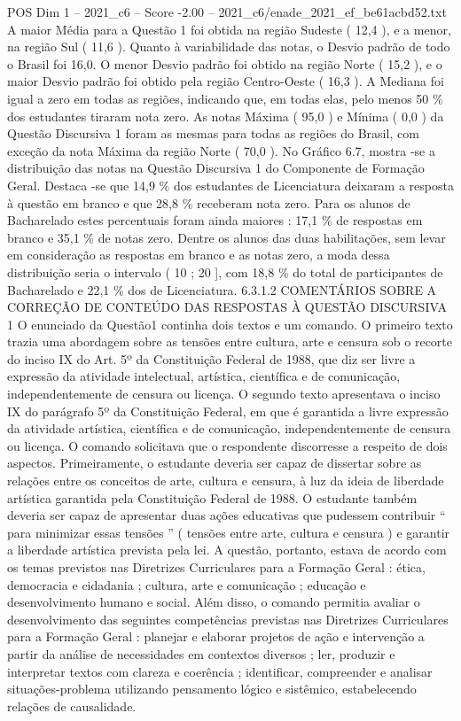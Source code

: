 \begin{textsample}{POS Dim 1 – 2021\_c6 – Score -2.00 – 2021\_c6/enade\_2021\_ef\_be61acbd52.txt}
A maior Média para a Questão 1 foi obtida na região Sudeste ( 12,4 ), e a menor, na região Sul ( 11,6 ).
Quanto à variabilidade das notas, o Desvio padrão de todo o Brasil foi 16,0.
O menor Desvio padrão foi obtido na região Norte ( 15,2 ), e o maior Desvio padrão foi obtido pela região Centro-Oeste ( 16,3 ).
A Mediana foi igual a zero em todas as regiões, indicando que, em todas elas, pelo menos 50 \% dos estudantes tiraram nota zero.
As notas Máxima ( 95,0 ) e Mínima ( 0,0 ) da Questão Discursiva 1 foram as mesmas para todas as regiões do Brasil, com exceção da nota Máxima da região Norte ( 70,0 ).
No Gráfico 6.7, mostra -se a distribuição das notas na Questão Discursiva 1 do Componente de Formação Geral.
Destaca -se que 14,9 \% dos estudantes de Licenciatura deixaram a resposta à questão em branco e que 28,8 \% receberam nota zero.
Para os alunos de Bacharelado estes percentuais foram ainda maiores : 17,1 \% de respostas em branco e 35,1 \% de notas zero.
Dentre os alunos das duas habilitações, sem levar em consideração as respostas em branco e as notas zero, a moda dessa distribuição seria o intervalo ( 10 ; 20 ], com 18,8 \% do total de participantes de Bacharelado e 22,1 \% dos de Licenciatura. 6.3.1.2 COMENTÁRIOS SOBRE A CORREÇÃO DE CONTEÚDO DAS RESPOSTAS À QUESTÃO DISCURSIVA 1 O enunciado da Questão1 continha dois textos e um comando.
O primeiro texto trazia uma abordagem sobre as tensões entre cultura, arte e censura sob o recorte do inciso IX do Art. 5º da Constituição Federal de 1988, que diz ser livre a expressão da atividade intelectual, artística, científica e de comunicação, independentemente de censura ou licença.
O segundo texto apresentava o inciso IX do parágrafo 5º da Constituição Federal, em que é garantida a livre expressão da atividade artística, científica e de comunicação, independentemente de censura ou licença.
O comando solicitava que o respondente discorresse a respeito de dois aspectos.
Primeiramente, o estudante deveria ser capaz de dissertar sobre as relações entre os conceitos de arte, cultura e censura, à luz da ideia de liberdade artística garantida pela Constituição Federal de 1988.
O estudante também deveria ser capaz de apresentar duas ações educativas que pudessem contribuir “ para minimizar essas tensões ” ( tensões entre arte, cultura e censura ) e garantir a liberdade artística prevista pela lei.
A questão, portanto, estava de acordo com os temas previstos nas Diretrizes Curriculares para a Formação Geral : ética, democracia e cidadania ; cultura, arte e comunicação ; educação e desenvolvimento humano e social.
Além disso, o comando permitia avaliar o desenvolvimento das seguintes competências previstas nas Diretrizes Curriculares para a Formação Geral : planejar e elaborar projetos de ação e intervenção a partir da análise de necessidades em contextos diversos ; ler, produzir e interpretar textos com clareza e coerência ; identificar, compreender e analisar situações-problema utilizando pensamento lógico e sistêmico, estabelecendo relações de causalidade.

\end{textsample}
